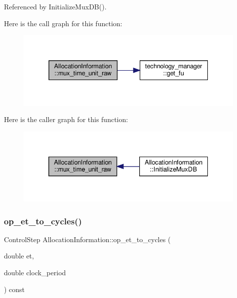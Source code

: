 Referenced by Initialize\+Mux\+D\+B().

Here is the call graph for this function\+:
\nopagebreak
\begin{figure}[H]
\begin{center}
\leavevmode
\includegraphics[width=331pt]{d7/d79/classAllocationInformation_adb31336cd112e8a0619fc8d26743bb0b_cgraph}
\end{center}
\end{figure}
Here is the caller graph for this function\+:
\nopagebreak
\begin{figure}[H]
\begin{center}
\leavevmode
\includegraphics[width=332pt]{d7/d79/classAllocationInformation_adb31336cd112e8a0619fc8d26743bb0b_icgraph}
\end{center}
\end{figure}
\mbox{\label{classAllocationInformation_a801fe716fe2feb8fa5dccbf0a5dc4259}} 
\subsubsection{\texorpdfstring{op\+\_\+et\+\_\+to\+\_\+cycles()}{op\_et\_to\_cycles()}}
{\footnotesize\ttfamily Control\+Step Allocation\+Information\+::op\+\_\+et\+\_\+to\+\_\+cycles (\begin{DoxyParamCaption}\item[{double}]{et,  }\item[{double}]{clock\+\_\+period }\end{DoxyParamCaption}) const}



